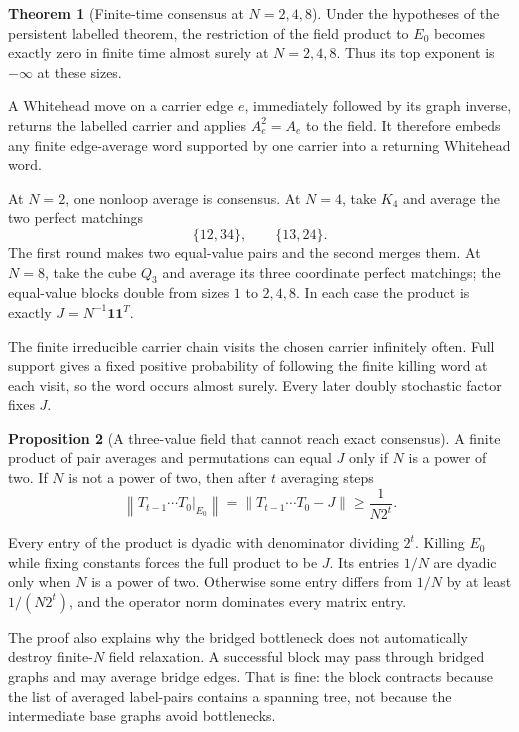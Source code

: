 \documentclass[11pt]{article}
\makeatletter
\newcommand{\one}{\mathbf 1}
\newcommand{\norm}[1]{\left\|#1\right\|}
\theoremstyle{definition}
\newtheorem{theorem}{Theorem}
\newtheorem{proposition}[theorem]{Proposition}
\renewenvironment{proof}[1][\proofname]{\par
  \pushQED{\qed}%
  \normalfont \topsep6\p@\@plus6\p@\relax
  \trivlist
  \item[\hskip\labelsep\bfseries #1\@addpunct{.}]\ignorespaces
}{%
  \popQED\endtrivlist\@endpefalse
}
\makeatother
\begin{document}
\begin{theorem}[Finite-time consensus at $N=2,4,8$]
Under the hypotheses of the persistent labelled theorem, the restriction of
the field product to $E_0$ becomes exactly zero in finite time almost surely at
$N=2,4,8$.  Thus its top exponent is $-\infty$ at these sizes.
\end{theorem}

\begin{proof}
A Whitehead move on a carrier edge $e$, immediately followed by its graph
inverse, returns the labelled carrier and applies $A_e^2=A_e$ to the field.
It therefore embeds any finite edge-average word supported by one carrier into
a returning Whitehead word.

At $N=2$, one nonloop average is consensus.  At $N=4$, take $K_4$ and average
the two perfect matchings
\[
    \{12,34\},\qquad \{13,24\}.
\]
The first round makes two equal-value pairs and the second merges them.  At
$N=8$, take the cube $Q_3$ and average its three coordinate perfect matchings;
the equal-value blocks double from sizes $1$ to $2,4,8$.  In each case the
product is exactly $J=N^{-1}\one\one^T$.

The finite irreducible carrier chain visits the chosen carrier infinitely
often.  Full support gives a fixed positive probability of following the
finite killing word at each visit, so the word occurs almost surely.  Every
later doubly stochastic factor fixes $J$.
\end{proof}

\begin{proposition}[A three-value field that cannot reach exact consensus]
A finite product of pair averages and permutations can equal $J$ only if $N$
is a power of two.  If $N$ is not a power of two, then after $t$ averaging
steps
\[
    \norm{T_{t-1}\cdots T_0|_{E_0}}
    =\norm{T_{t-1}\cdots T_0-J}
    \ge \frac{1}{N2^t}.
\]
\end{proposition}

\begin{proof}
Every entry of the product is dyadic with denominator dividing $2^t$.  Killing
$E_0$ while fixing constants forces the full product to be $J$.  Its entries
$1/N$ are dyadic only when $N$ is a power of two.  Otherwise some entry differs
from $1/N$ by at least $1/(N2^t)$, and the operator norm dominates every
matrix entry.
\end{proof}

The proof also explains why the bridged bottleneck does not automatically
destroy finite-$N$ field relaxation.  A successful block may pass through
bridged graphs and may average bridge edges.  That is fine: the block contracts
because the list of averaged label-pairs contains a spanning tree, not because
the intermediate base graphs avoid bottlenecks.
\end{document}
